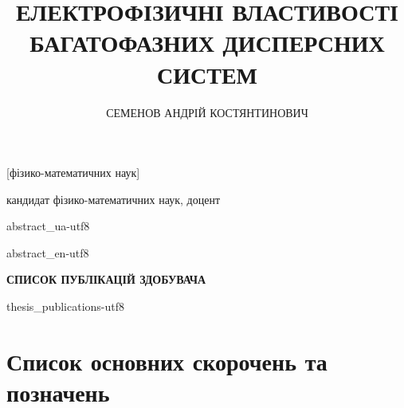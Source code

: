 \documentclass[14pt,twoside]{vakthesis}
\begin{document}

\author{СЕМЕНОВ АНДРІЙ КОСТЯНТИНОВИЧ}


\title{ЕЛЕКТРОФІЗИЧНІ ВЛАСТИВОСТІ\\
БАГАТОФАЗНИХ ДИСПЕРСНИХ СИСТЕМ}

[фізико-математичних наук]

           {кандидат фізико-математичних наук, доцент}

\date{\the\year}

\maketitle

\shipout\null
{abstract_ua-utf8}


\newpage
{abstract_en-utf8}

\newpage
\begin{center}
    {\normalfont \textbf{СПИСОК ПУБЛІКАЦІЙ ЗДОБУВАЧА}}
\end{center}
\vskip 20pt

{thesis_publications-utf8}


\newpage
\tableofcontents

\chapter*{Список основних скорочень та позначень}
\end{document}
